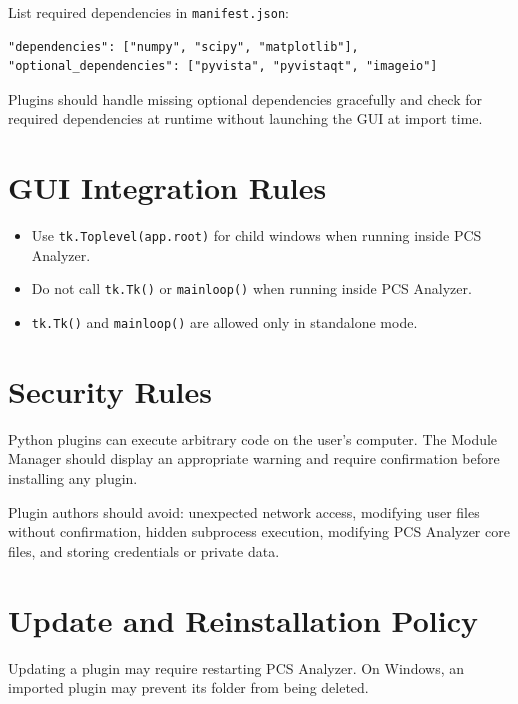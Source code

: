 \documentclass[11pt, a4paper]{article}
\begin{document}
List required dependencies in \texttt{manifest.json}:

\begin{lstlisting}[style=json]
"dependencies": ["numpy", "scipy", "matplotlib"],
"optional_dependencies": ["pyvista", "pyvistaqt", "imageio"]
\end{lstlisting}

Plugins should handle missing optional dependencies gracefully and check for required dependencies at runtime without launching the GUI at import time.

\section{GUI Integration Rules}

\begin{itemize}
  \item Use \texttt{tk.Toplevel(app.root)} for child windows when running inside PCS Analyzer.
  \item Do not call \texttt{tk.Tk()} or \texttt{mainloop()} when running inside PCS Analyzer.
  \item \texttt{tk.Tk()} and \texttt{mainloop()} are allowed only in standalone mode.
\end{itemize}

\section{Security Rules}

Python plugins can execute arbitrary code on the user's computer. The Module Manager should display an appropriate warning and require confirmation before installing any plugin.

Plugin authors should avoid: unexpected network access, modifying user files without confirmation, hidden subprocess execution, modifying PCS Analyzer core files, and storing credentials or private data.

\section{Update and Reinstallation Policy}

Updating a plugin may require restarting PCS Analyzer. On Windows, an imported plugin may prevent its folder from being deleted.
\end{document}
